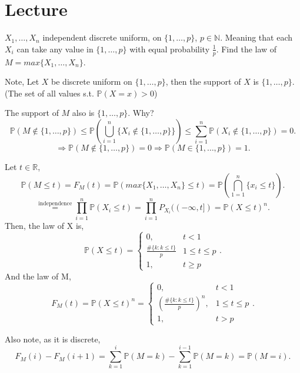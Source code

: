 \section{Lecture}%
\label{sec:Lecture11}

\begin{exercise}[]
    \label{ex:11.7}
    $X_1, \ldots, X_n$ independent discrete uniform, on $\{1, \ldots, p\} $, $p \in \mathbb{N}$.
    Meaning that each $X_i$ can take any value in $\{1, \ldots, p\} $ with equal probability $\frac{1}{p}$.
    Find the law of $M = max \{X_1, \ldots, X_n\} $.

    Note, Let $X$ be discrete uniform on $\{1, \ldots, p\} $, then the support of $X$ is
    $\{1, \ldots, p\} $. (The set of all values s.t. $\mathbb{P}(X=x)>0$)

    The support of $M$ also is $\{1, \ldots, p\} $. Why?
    \[
    \mathbb{P}(M \not\in  \{1, \ldots, p\} ) \le  \mathbb{P}(\bigcup_{i = 1} ^{n} \{X_i \not\in \{1, \ldots,p\} \} )
    \le \sum_{i=1}^{n} \mathbb{P}(X_i \not\in \{1,\ldots,p\} ) = 0
    .\] 
    \[
    \Rightarrow \mathbb{P}(M \not\in \{1,\ldots,p\} ) = 0 \Rightarrow \mathbb{P}(M \in \{1, \ldots, p\} )=1
    .\] 

    Let $t \in \mathbb{R}$, 
    \[
    \mathbb{P}(M \le t) = F_M (t) = \mathbb{P}(max \{X_1, \ldots, X_n\} \le  t)
    = \mathbb{P}(\bigcap _{1 = 1} ^{n} \{x_i \le t\} )
    .\] 
    \[
    \stackrel{\text{independence}}{=} \prod_{i=1}^{n} \mathbb{P}(X_i \le t)
    =\prod_{i=1}^{n}P_{X_i}((-\infty, t]) = \mathbb{P}(X \le t)^{n}
    .\] 
    Then, the law of X is,
    \[
    \mathbb{P}(X\le t) = 
    \begin{cases}
        0, & t<1 \\
        \frac{\# \{k: k\le t\} }{p}  & 1\le t\le p \\ 
        1, & t\ge p
    \end{cases}
    .\] 
    And the law of M,
    \[
    F_M(t)=\mathbb{P}(X\le t)^{n} =
    \begin{cases}
        0, & t<1 \\
        (\frac{\# \{k: k\le t\} }{p})^{n}, & 1 \le t\le p \\
        1, & t>p
    \end{cases}
    .\] 

    Also note, as it is discrete,
    \[
    F_M(i) - F_M(i+1) = \sum_{k=1}^{i} \mathbb{P}(M=k) - \sum_{k=1}^{i-1} \mathbb{P}(M=k) = \mathbb{P}(M = i)
    .\] 

\end{exercise}


